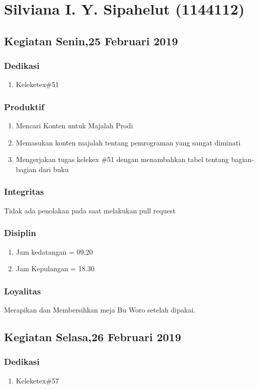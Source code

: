 \chapter{Silviana I. Y. Sipahelut (1144112)}

\section{Kegiatan Senin,25 Februari 2019}
\subsection{Dedikasi}
\begin{enumerate}
\item Keleketex\#51
\end{enumerate}
\subsection{Produktif}
\begin{enumerate}
\item Mencari Konten untuk Majalah Prodi
\item Memasukan konten majalah tentang pemrograman yang sangat diminati
\item Mengerjakan tugas kelekex \#51 dengan menambahkan tabel tentang bagian-bagian dari buku
\end{enumerate}
\subsection{Integritas}
Tidak ada penolakan pada saat melakukan pull request
\subsection{Disiplin}
\begin{enumerate}
\item Jam kedatangan = 09.20
\item Jam Kepulangan = 18.30
\end{enumerate}
\subsection{Loyalitas}
Merapikan dan Membersihkan meja Bu Woro setelah dipakai.

\section{Kegiatan Selasa,26 Februari 2019}
\subsection{Dedikasi}
\begin{enumerate}
\item Keleketex\#57
\end{enumerate}
